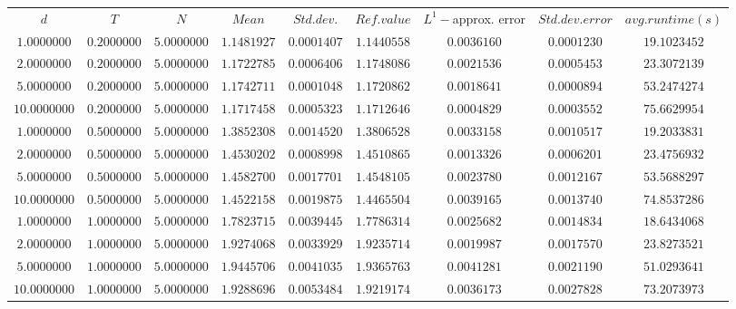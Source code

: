 \begin{tabular}{ccccccccc}
$d$ & $T$ & $N$ & $Mean$ & $Std. dev.$ & $Ref. value$ & $L^1-$approx. error & $Std. dev. error$ & $avg. runtime (s)$\\
$1.0000000$ & $0.2000000$ & $5.0000000$ & $1.1481927$ & $0.0001407$ & $1.1440558$ & $0.0036160$ & $0.0001230$ & $19.1023452$\\
$2.0000000$ & $0.2000000$ & $5.0000000$ & $1.1722785$ & $0.0006406$ & $1.1748086$ & $0.0021536$ & $0.0005453$ & $23.3072139$\\
$5.0000000$ & $0.2000000$ & $5.0000000$ & $1.1742711$ & $0.0001048$ & $1.1720862$ & $0.0018641$ & $0.0000894$ & $53.2474274$\\
$10.0000000$ & $0.2000000$ & $5.0000000$ & $1.1717458$ & $0.0005323$ & $1.1712646$ & $0.0004829$ & $0.0003552$ & $75.6629954$\\
$1.0000000$ & $0.5000000$ & $5.0000000$ & $1.3852308$ & $0.0014520$ & $1.3806528$ & $0.0033158$ & $0.0010517$ & $19.2033831$\\
$2.0000000$ & $0.5000000$ & $5.0000000$ & $1.4530202$ & $0.0008998$ & $1.4510865$ & $0.0013326$ & $0.0006201$ & $23.4756932$\\
$5.0000000$ & $0.5000000$ & $5.0000000$ & $1.4582700$ & $0.0017701$ & $1.4548105$ & $0.0023780$ & $0.0012167$ & $53.5688297$\\
$10.0000000$ & $0.5000000$ & $5.0000000$ & $1.4522158$ & $0.0019875$ & $1.4465504$ & $0.0039165$ & $0.0013740$ & $74.8537286$\\
$1.0000000$ & $1.0000000$ & $5.0000000$ & $1.7823715$ & $0.0039445$ & $1.7786314$ & $0.0025682$ & $0.0014834$ & $18.6434068$\\
$2.0000000$ & $1.0000000$ & $5.0000000$ & $1.9274068$ & $0.0033929$ & $1.9235714$ & $0.0019987$ & $0.0017570$ & $23.8273521$\\
$5.0000000$ & $1.0000000$ & $5.0000000$ & $1.9445706$ & $0.0041035$ & $1.9365763$ & $0.0041281$ & $0.0021190$ & $51.0293641$\\
$10.0000000$ & $1.0000000$ & $5.0000000$ & $1.9288696$ & $0.0053484$ & $1.9219174$ & $0.0036173$ & $0.0027828$ & $73.2073973$\\
\end{tabular}
